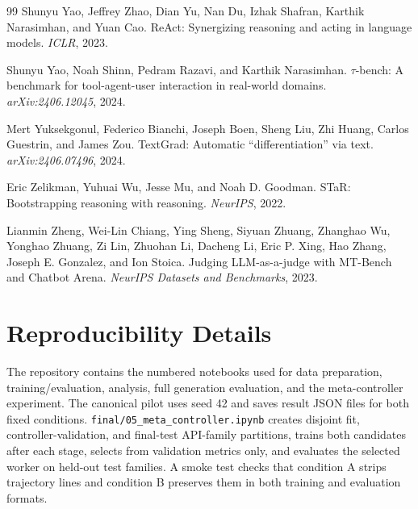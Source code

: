\documentclass{article}
\begin{document}
\begin{thebibliography}{99}
Shunyu Yao, Jeffrey Zhao, Dian Yu, Nan Du, Izhak Shafran, Karthik Narasimhan, and Yuan Cao.
\newblock ReAct: Synergizing reasoning and acting in language models.
\newblock \emph{ICLR}, 2023.

Shunyu Yao, Noah Shinn, Pedram Razavi, and Karthik Narasimhan.
\newblock $\tau$-bench: A benchmark for tool-agent-user interaction in real-world domains.
\newblock \emph{arXiv:2406.12045}, 2024.

Mert Yuksekgonul, Federico Bianchi, Joseph Boen, Sheng Liu, Zhi Huang, Carlos Guestrin, and James Zou.
\newblock TextGrad: Automatic ``differentiation'' via text.
\newblock \emph{arXiv:2406.07496}, 2024.

Eric Zelikman, Yuhuai Wu, Jesse Mu, and Noah D. Goodman.
\newblock STaR: Bootstrapping reasoning with reasoning.
\newblock \emph{NeurIPS}, 2022.

Lianmin Zheng, Wei-Lin Chiang, Ying Sheng, Siyuan Zhuang, Zhanghao Wu, Yonghao Zhuang, Zi Lin, Zhuohan Li, Dacheng Li, Eric P. Xing, Hao Zhang, Joseph E. Gonzalez, and Ion Stoica.
\newblock Judging LLM-as-a-judge with MT-Bench and Chatbot Arena.
\newblock \emph{NeurIPS Datasets and Benchmarks}, 2023.

\end{thebibliography}

\appendix
\section{Reproducibility Details}

The repository contains the numbered notebooks used for data preparation, training/evaluation, analysis, full generation evaluation, and the meta-controller experiment. The canonical pilot uses seed 42 and saves result JSON files for both fixed conditions. \texttt{final/05\_meta\_controller.ipynb} creates disjoint fit, controller-validation, and final-test API-family partitions, trains both candidates after each stage, selects from validation metrics only, and evaluates the selected worker on held-out test families. A smoke test checks that condition A strips trajectory lines and condition B preserves them in both training and evaluation formats.
\end{document}
